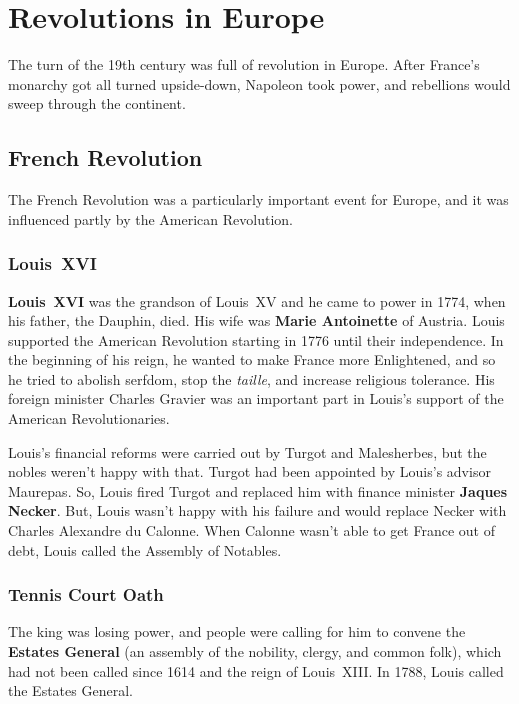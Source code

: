\chapter{Revolutions in Europe}

The turn of the 19th century was full of revolution in Europe.
After France's monarchy got all turned upside-down, Napoleon took power,
and rebellions would sweep through the continent.

\section{French Revolution}

The French Revolution was a particularly important event for Europe,
and it was influenced partly by the American Revolution.

\subsection*{Louis~XVI}

\textbf{Louis~XVI} was the grandson of Louis~XV and he came to power in 1774,
when his father, the Dauphin, died.
His wife was \textbf{Marie Antoinette} of Austria.
Louis supported the American Revolution starting in 1776 until their independence.
In the beginning of his reign, he wanted to make France more Enlightened,
and so he tried to abolish serfdom, stop the \textit{taille}, and increase religious tolerance.
His foreign minister Charles Gravier was an important part in Louis's support of the American Revolutionaries.

Louis's financial reforms were carried out by Turgot and Malesherbes, but the nobles weren't happy with that.
Turgot had been appointed by Louis's advisor Maurepas.
So, Louis fired Turgot and replaced him with finance minister \textbf{Jaques Necker}.
But, Louis wasn't happy with his failure and would replace Necker with Charles Alexandre du Calonne.
When Calonne wasn't able to get France out of debt, Louis called the Assembly of Notables.

\subsection*{Tennis Court Oath}

The king was losing power, and people were calling for him to convene the \textbf{Estates General}
(an assembly of the nobility, clergy, and common folk),
which had not been called since 1614 and the reign of Louis~XIII\@.
In 1788, Louis called the Estates General.

